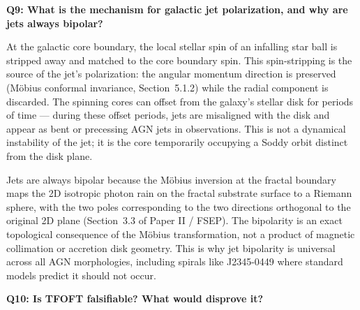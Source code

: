   \begin{mdframed}
  \textbf{Q9: What is the mechanism for galactic jet polarization, and why are
  jets always bipolar?}
  \end{mdframed}

  At the galactic core boundary, the local stellar spin of an infalling star ball
  is stripped away and matched to the core boundary spin. This spin-stripping is
  the source of the jet's polarization: the angular momentum direction is
  preserved (Möbius conformal invariance, Section~5.1.2) while the radial component
  is discarded. The spinning cores can offset from the galaxy's stellar disk for
  periods of time --- during these offset periods, jets are misaligned with the
  disk and appear as bent or precessing AGN jets in observations. This is not a
  dynamical instability of the jet; it is the core temporarily occupying a
  Soddy orbit distinct from the disk plane.

  Jets are always bipolar because the Möbius inversion at the fractal boundary
  maps the 2D isotropic photon rain on the fractal substrate surface to a Riemann
  sphere, with the two poles corresponding to the two directions orthogonal to
  the original 2D plane (Section~3.3 of Paper II / FSEP). The bipolarity is an
  exact topological consequence of the Möbius transformation, not a product of
  magnetic collimation or accretion disk geometry. This is why jet bipolarity
  is universal across all AGN morphologies, including spirals like J2345-0449
  where standard models predict it should not occur.

  \begin{mdframed}
  \textbf{Q10: Is TFOFT falsifiable? What would disprove it?}
  \end{mdframed}

